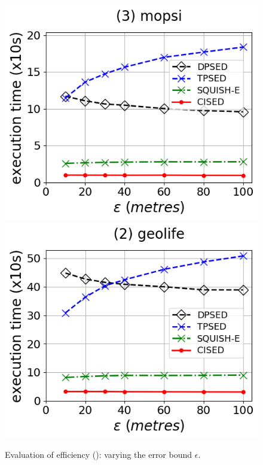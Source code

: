 \begin{figure}[tb!]
	\includegraphics[scale=0.315]{Figures/Exp-PED-time-epsilon-mopsi.png}	\hspace{1ex}
	\includegraphics[scale=0.315]{Figures/Exp-PED-time-epsilon-geolife.png}	\hspace{1ex}
	\vspace{-2.5ex}
	\caption{\small Evaluation of efficiency (\ped): varying the error bound $\epsilon$.}\label{fig:time-epsilon-ped}
	\vspace{-1ex}
\end{figure}

